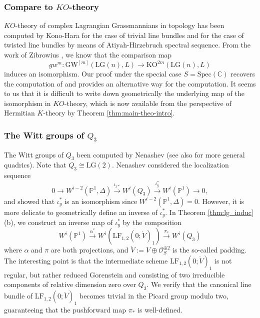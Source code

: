 \documentclass[a4paper]{amsart}
\theoremstyle{plain}
\theoremstyle{definition}
\numberwithin{equation}{section}
\newcommand{\GW}{\mathrm{GW}}
\newcommand{\LG}{\mathrm{LG}}
\newcommand{\SO}{\mathcal{O}}
\newcommand{\LF}{\mathrm{LF}}
\begin{document}
\subsubsection{Compare to $KO$-theory}
$KO$-theory of complex Lagrangian Grassmannians in topology has been computed by Kono-Hara \cite{kono1992ko} for the case of trivial line bundles and \cite{zibrowius2011witt} for the case of twisted line bundles by means of Atiyah-Hirzebruch spectral sequence. From the work of Zibrowius  \cite{zibrowius2011witt}, we know that the comparison map
$$gw^m: \GW^{[m]}(\LG(n),L ) \to \mathrm{KO}^{2m}(\LG(n),L )$$
induces an isomorphism. Our proof under the special case $S = \mathrm{Spec}(\mathbb{C})$ recovers the computation of \cite{kono1992ko}  and \cite{zibrowius2011witt} provides an alternative way for the computation. It seems to us that it is difficult to write down geometrically the underlying map of the isomorphism in $KO$-theory, which is now available from the perspective of Hermitian $K$-theory by Theorem \ref{thm:main-theo-intro}.

\subsubsection{The Witt groups of $Q_3$}\label{sec:Witt-Q3} The Witt groups of $Q_3$  been computed by Nenashev \cite{nenashev2009on} (see also \cite{xie2019witt} for more general quadrics). Note that $Q_3 \cong \LG(2)$. Nenashev considered the localization sequence
$$0 \to W^{i-2}(\mathbb{P}^1, \Delta) \xrightarrow{\iota_{x*}} W^i(Q_3) \xrightarrow{\iota_y^*} W^i(\mathbb{P}^1) \to 0,  $$
and showed that $\iota^*_y$ is an isomorphism since $W^{i-2}(\mathbb{P}^1, \Delta) = 0$. However, it is more delicate to geometrically define an inverse of $\iota_y^*$. In Theorem \ref{thm:lg_induc} (b), we construct an inverse map of $\iota_y^*$ by the composition $$W^i(\mathbb{P}^1) \xrightarrow{\alpha^*} W^i(\LF_{1,2}(0;\mathring{V})_1) \xrightarrow{\pi_*} W^i(Q_3)$$
where $\alpha$  and $ \pi$ are both projections, and $\mathring{V} := V\oplus \SO_S^{\oplus 2}$ is the so-called padding. The interesting point is that the intermediate scheme $\LF_{1,2}(0;\mathring{V})_1$ is not regular, but rather reduced Gorenstein and consisting of two irreducible components of relative dimension zero over $Q_3$. We verify that the canonical line bundle of $\LF_{1,2}(0;\mathring{V})_1$ becomes trivial in the Picard group modulo two, guaranteeing that the pushforward map $\pi_*$ is well-defined.
\end{document}
